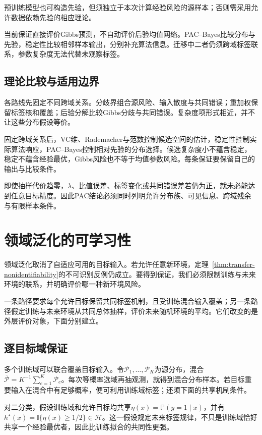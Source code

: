 预训练模型也可构造先验，但须独立于本次计算经验风险的源样本；否则需采用允许数据依赖先验的相应理论。

当前保证直接评价Gibbs预测，不自动评价后验均值网络。PAC--Bayes比较分布与先验，稳定性比较相邻样本输出，分别补充算法信息。迁移中二者仍须跨域标签联系，参数复杂度无法代替未观察标签。

\subsection{理论比较与适用边界}
\label{sec:adaptation-comparison}

各路线先固定不同跨域关系。分歧界组合源风险、输入散度与共同错误；重加权保留标签核和覆盖；后验分解比较Gibbs分歧与共同错误。复杂度项形式相近，并不让这些分布假设等价。

固定跨域关系后，VC维、Rademacher与范数控制候选空间的估计，稳定性控制实际算法响应，PAC--Bayes控制相对先验的分布选择。候选复杂度小不蕴含稳定，稳定不蕴含经验最优，Gibbs风险也不等于均值参数风险。每条保证要保留自己的输出与比较条件。

即使抽样代价趋零，$\lambda$、比值误差、标签变化或共同错误差若仍为正，就未必能达到任意目标精度。因此PAC结论必须同时列明允许分布族、可见信息、跨域残余与有限样本条件。

\section{领域泛化的可学习性}
\label{sec:domain-generalization}

领域泛化取消了自适应可用的目标输入。若允许任意新环境，定理~\ref{thm:transfer-nonidentifiability}的不可识别反例仍成立。要得到保证，我们必须限制训练与未来环境的联系，并明确评价哪一种新环境风险。

一条路径要求每个允许目标保留共同标签机制，且受训练混合输入覆盖；另一条路径假定训练与未来环境从共同总体抽样，评价未来随机环境的平均。它们改变的是外层评价对象，下面分别建立。

\subsection{逐目标域保证}
\label{sec:dg-shared-mechanism}

多个训练域可以联合覆盖目标输入。令$\mathcal P_1,\ldots,\mathcal P_K$为源分布，混合$\overline{\mathcal P}=K^{-1}\sum_{e=1}^K\mathcal P_e$。每次等概率选域再抽观测，就得到混合分布样本。若目标重要输入在混合中有足够概率，便可利用训练域标签；还须下面的共享机制条件。

对二分类，假设训练域和允许目标均共享$\eta(x)=\mathbb P(y=1\mid x)$，并有$h^\star(x)=\mathbb I\{\eta(x)\geq1/2\}\in\mathcal H$。这一假设规定未来标签规律，不只是训练域恰好共享一个经验最优者，因此比训练拟合的共同性更强。

